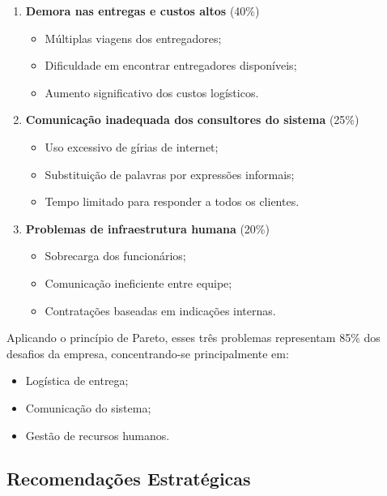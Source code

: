 \documentclass[11pt]{article}
\begin{document}
\begin{enumerate}
    \item \textbf{Demora nas entregas e custos altos} (40\%)
    \begin{itemize}
        \item Múltiplas viagens dos entregadores;
        \item Dificuldade em encontrar entregadores disponíveis;
        \item Aumento significativo dos custos logísticos.
    \end{itemize}
    \item \textbf{Comunicação inadequada dos consultores do sistema} (25\%)
    \begin{itemize}
        \item Uso excessivo de gírias de internet;
        \item Substituição de palavras por expressões informais;
        \item Tempo limitado para responder a todos os clientes.
    \end{itemize}
    \item \textbf{Problemas de infraestrutura humana} (20\%)
    \begin{itemize}
        \item Sobrecarga dos funcionários;
        \item Comunicação ineficiente entre equipe;
        \item Contratações baseadas em indicações internas.
    \end{itemize}
\end{enumerate}



Aplicando o princípio de Pareto, esses três problemas representam 85\% dos desafios da empresa, concentrando-se principalmente em:
\begin{itemize}
    \item Logística de entrega;
    \item Comunicação do sistema;
    \item Gestão de recursos humanos.
\end{itemize}

\subsection*{Recomendações Estratégicas}
\end{document}
